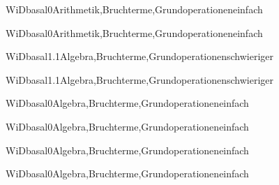 \documentclass[12pt]{article}
\begin{document}
    \begin{Add}{WiD}{basal0}{Arithmetik,Bruchterme,Grundoperationen}{einfach}
    \solution{ }
    \end{Add}
    \begin{Add}{WiD}{basal0}{Arithmetik,Bruchterme,Grundoperationen}{einfach}
    \end{Add}
    

    \begin{Add}{WiD}{basal1.1}{Algebra,Bruchterme,Grundoperationen}{schwieriger}
    \solution{ }
    \end{Add}
    \begin{Add}{WiD}{basal1.1}{Algebra,Bruchterme,Grundoperationen}{schwieriger}
    \end{Add}
    

    \begin{Add}{WiD}{basal0}{Algebra,Bruchterme,Grundoperationen}{einfach}
    \solution{ }
    \end{Add}
    \begin{Add}{WiD}{basal0}{Algebra,Bruchterme,Grundoperationen}{einfach}
    \end{Add}
    

    \begin{Add}{WiD}{basal0}{Algebra,Bruchterme,Grundoperationen}{einfach}
    \solution{ }
    \end{Add}
    \begin{Add}{WiD}{basal0}{Algebra,Bruchterme,Grundoperationen}{einfach}
    \end{Add}
    
\end{document}
